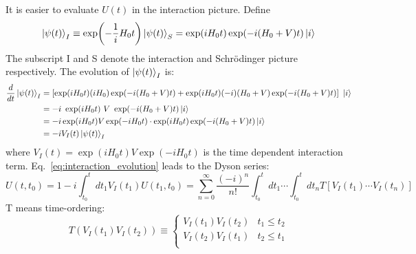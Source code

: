It is easier to evaluate $U(t)$ in the interaction picture. Define
\begin{equation}
    \ket{\psi(t)}_I \equiv \exp(-\frac{1}{i}H_0 t) \ket{\psi(t)}_S 
    = \exp(iH_0 t) \exp(-i (H_0 + V) t)\ket{i}
\end{equation}
The subscript I and S denote the interaction and Schr\"odinger picture respectively.
The evolution of $\ket{\psi(t)}_I$ is:
\begin{equation}
    \begin{aligned}
	\frac{d}{dt}\ket{\psi(t)}_I 
	&= \left[ \exp(i H_0 t) (iH_0) \exp(-i (H_0 + V) t)
	+ \exp(i H_0 t) (-i)(H_0 + V) \exp(-i (H_0 + V) t) \right] \ \ket{i}  \\
	&= -i\ \exp(i H_0 t)\ V \ \exp(-i (H_0 + V) t) \ket{i}   \\
	&= -i \exp(iH_0 t) V \exp(-iH_0 t) \cdot \exp(iH_0 t) \exp(-i(H_0 + V)t) \ket{i}   \\
	&= -i V_I(t) \ket{\psi(t)}_I
    \end{aligned}
    \label{eq:interaction_evolution}
\end{equation}
where $V_I(t) = \exp(iH_0t)V\exp(-iH_0t)$ is the time dependent interaction term.
Eq.~\ref{eq:interaction_evolution} leads to the Dyson series:
\begin{equation}
    U(t, t_0) = 1 - i\int_{t_0}^t dt_1 V_I(t_1) U(t_1, t_0) = \sum_{n=0}^\infty \frac{(-i)^n}{n!}\int_{t_0}^t dt_1 \cdots \int_{t_0}^t dt_n T[V_I(t_1)\cdots V_I(t_n)]
\end{equation}
T means time-ordering:
\begin{equation}
    T(V_I(t_1) V_I(t_2)) \equiv 
    \begin{cases}
	V_I(t_1)V_I(t_2)    & t_1 \le t_2   \\
	V_I(t_2)V_I(t_1)    & t_2 \le t_1   \\
    \end{cases}
\end{equation}

